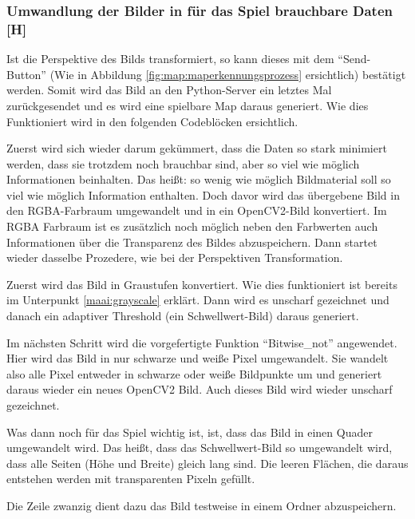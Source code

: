 \subsubsection{Umwandlung der Bilder in für das Spiel brauchbare Daten [H]}\label{maai:udbifdsbd:head}
Ist die Perspektive des Bilds transformiert, so kann dieses mit dem ``Send-Button'' (Wie in Abbildung \ref{fig:map:maperkennungsprozess} ersichtlich) bestätigt werden.
Somit wird das Bild an den Python-Server ein letztes Mal zurückgesendet und es wird eine spielbare Map daraus generiert.
Wie dies Funktioniert wird in den folgenden Codeblöcken ersichtlich.

Zuerst wird sich wieder darum gekümmert, dass die Daten so stark minimiert werden, dass sie trotzdem noch brauchbar sind, aber so viel wie möglich Informationen beinhalten. Das heißt: so wenig wie möglich Bildmaterial soll so viel wie möglich Information enthalten. Doch davor wird das übergebene Bild in den RGBA-Farbraum umgewandelt und in ein OpenCV2-Bild konvertiert. Im RGBA Farbraum ist es zusätzlich noch möglich neben den Farbwerten auch Informationen über die Transparenz des Bildes abzuspeichern. Dann startet wieder dasselbe Prozedere, wie bei der Perspektiven Transformation.

Zuerst wird das Bild in Graustufen konvertiert. Wie dies funktioniert ist bereits im Unterpunkt \ref{maai:grayscale} erklärt. Dann wird es unscharf gezeichnet und danach ein adaptiver Threshold (ein Schwellwert-Bild) daraus generiert.

Im nächsten Schritt wird die vorgefertigte Funktion ``Bitwise\_not'' angewendet. Hier wird das Bild in nur schwarze und weiße Pixel umgewandelt. Sie wandelt also alle Pixel entweder in schwarze oder weiße Bildpunkte um und generiert daraus wieder ein neues OpenCV2 Bild. Auch dieses Bild wird wieder unscharf gezeichnet.

Was dann noch für das Spiel wichtig ist, ist, dass das Bild in einen Quader umgewandelt wird. Das heißt, dass das Schwellwert-Bild so umgewandelt wird, dass alle Seiten (Höhe und Breite) gleich lang sind. Die leeren Flächen, die daraus entstehen werden mit transparenten Pixeln gefüllt.

Die Zeile zwanzig dient dazu das Bild testweise in einem Ordner abzuspeichern.

